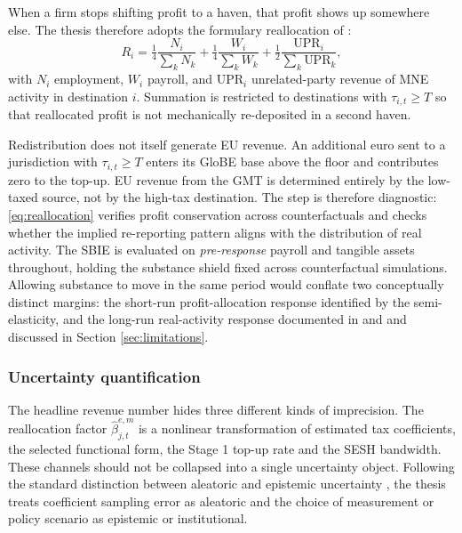 \documentclass[11pt,a4paper]{article}
\begin{document}
When a firm stops shifting profit to a haven, that profit shows up somewhere else. The thesis therefore adopts the formulary reallocation of \citet{garcia-bernardo2024}:
\begin{equation}\label{eq:reallocation}
R_i = \tfrac{1}{4}\frac{N_i}{\sum_{k} N_k} + \tfrac{1}{4}\frac{W_i}{\sum_{k} W_k} + \tfrac{1}{2}\frac{\text{UPR}_i}{\sum_{k} \text{UPR}_k},
\end{equation}
with $N_i$ employment, $W_i$ payroll, and $\text{UPR}_i$ unrelated-party revenue of MNE activity in destination $i$. Summation is restricted to destinations with $\tau_{i,t} \geq T$ so that reallocated profit is not mechanically re-deposited in a second haven.

Redistribution does not itself generate EU revenue. An additional euro sent to a jurisdiction with $\tau_{i,t}\ge T$ enters its GloBE base above the floor and contributes zero to the top-up. EU revenue from the GMT is determined entirely by the low-taxed source, not by the high-tax destination. The step is therefore diagnostic: \eqref{eq:reallocation} verifies profit conservation across counterfactuals and checks whether the implied re-reporting pattern aligns with the distribution of real activity. The SBIE is evaluated on \emph{pre-response} payroll and tangible assets throughout, holding the substance shield fixed across counterfactual simulations. Allowing substance to move in the same period would conflate two conceptually distinct margins: the short-run profit-allocation response identified by the semi-elasticity, and the long-run real-activity response documented in \citet{bilicka2022} and \citet{suarezserrato2018} and discussed in Section \ref{sec:limitations}.

\subsubsection{Uncertainty quantification}\label{sec:beta_uncertainty}

The headline revenue number hides three different kinds of imprecision. The reallocation factor $\hat{\beta}_{j,t}^{e,m}$ is a nonlinear transformation of estimated tax coefficients, the selected functional form, the Stage 1 top-up rate and the SESH bandwidth. These channels should not be collapsed into a single uncertainty object. Following the standard distinction between aleatoric and epistemic uncertainty \citep{hullermeier2021}, the thesis treats coefficient sampling error as aleatoric and the choice of measurement or policy scenario as epistemic or institutional.
\end{document}
